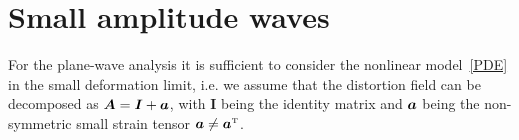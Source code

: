 \documentclass[
10pt, %
a4paper, %
oneside, %
headinclude,footinclude, %
table
]{scrartcl}
\begin{document}
\section{Small amplitude waves}

For the plane-wave analysis it is sufficient to consider the nonlinear model~\eqref{PDE} in the 
small deformation limit, i.e. we assume that the distortion field can be decomposed as $ \bm{A} = 
\bm{I} + \bm{a} $, with $ \bm{I} $ being the identity matrix and $ \bm{a} $ being the 
non-symmetric small strain tensor $ \Distsmall \neq \Distsmall^\transpose $.



\printbibliography
\end{document}

